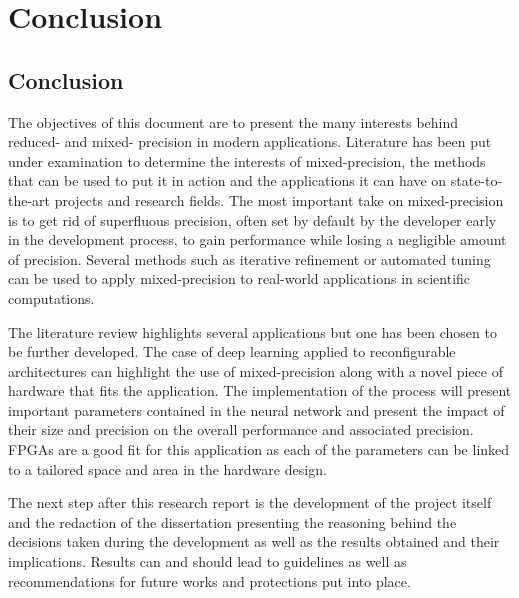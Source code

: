 \chapter{Conclusion} %

\label{Chapter9} %



\section{Conclusion}

The objectives of this document are to present the many interests behind reduced- and mixed- precision in modern applications. Literature has been put under examination to determine the interests of mixed-precision, the methods that can be used to put it in action and the applications it can have on state-to-the-art projects and research fields. The most important take on mixed-precision is to get rid of superfluous precision, often set by default by the developer early in the development process, to gain performance while losing a negligible amount of precision. Several methods such as iterative refinement or automated tuning can be used to apply mixed-precision to real-world applications in scientific computations.

The literature review highlights several applications but one has been chosen to be further developed. The case of deep learning applied to reconfigurable architectures can highlight the use of mixed-precision along with a novel piece of hardware that fits the application. The implementation of the process will present important parameters contained in the neural network and present the impact of their size and precision on the overall performance and associated precision. FPGAs are a good fit for this application as each of the parameters can be linked to a tailored space and area in the hardware design.

The next step after this research report is the development of the project itself and the redaction of the dissertation presenting the reasoning behind the decisions taken during the development as well as the results obtained and their implications. Results can and should lead to guidelines as well as recommendations for future works and protections put into place.
